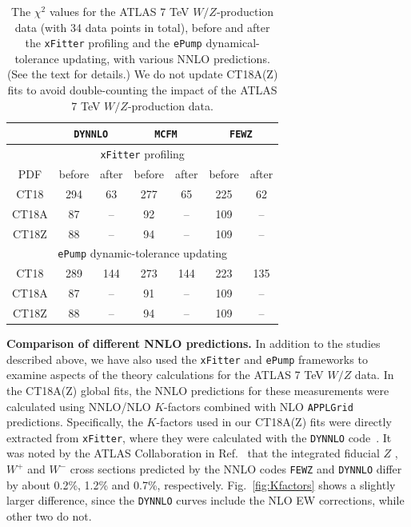 \begin{table}
\caption{
The $\chi^2$ values for the ATLAS 7 TeV $W/Z$-production data (with 34 data points in total), before and after the \texttt{xFitter} profiling and the \texttt{ePump} dynamical-tolerance updating, with various NNLO predictions. (See the text for details.)
We do not update  CT18A(Z) fits to avoid 
double-counting the impact of the ATLAS 7 TeV $W/Z$-production data.
}
\label{tab:chi2Kfactors}
\begin{tabular}{c|c|c|c|c|c|c}
\hline
 &  \multicolumn{2}{c|}{\texttt{DYNNLO}} &    \multicolumn{2}{c|}{\texttt{MCFM}} &  \multicolumn{2}{c}{\texttt{FEWZ}}  \\
\hline
\multicolumn{7}{c}{\texttt{xFitter} profiling}\\
\hline
PDF & before & after   & before & after   & before & after \\
\hline
CT18 & 294 & 63    &  277 & 65  & 225  &  62   \\
CT18A & 87  & --   & 92   & --  & 109  & --    \\
CT18Z & 88 &   --  &  94  & --  & 109  &  --  \\
\hline
\multicolumn{7}{c}{\texttt{ePump} dynamic-tolerance updating}\\
\hline
CT18 & 289 & 144   &  273  & 144    & 223   & 135    \\
CT18A & 87 & --   &  91  & --  &  109 &  --  \\
CT18Z & 88 &   --   &  94  & --  &  109 & --  \\
\hline
\end{tabular}
\end{table}

{\bf Comparison of different NNLO predictions.}
In addition to the studies described above, we have also used the \texttt{xFitter} and \texttt{ePump} frameworks
to examine aspects of the theory calculations for the ATLAS 7 TeV $W/Z$ data.
%
In the CT18A(Z) global fits, the NNLO predictions for these measurements were calculated using NNLO/NLO $K$-factors combined with NLO  \texttt{APPLGrid} predictions.  Specifically, the $K$-factors used in our CT18A(Z) fits were 
directly extracted from \texttt{xFitter}, where they were calculated with the \texttt{DYNNLO} code~\cite{Catani:2007vq,Catani:2009sm}. 
It was noted by the ATLAS Collaboration in 
Ref.~\cite{Aaboud:2016btc} that the integrated fiducial  $Z$ , $W^{+}$ and $W^{-}$ cross sections predicted by the NNLO codes 
\texttt{FEWZ} \cite{Gavin:2010az,Gavin:2012sy,Li:2012wna} and \texttt{DYNNLO} \cite{Catani:2007vq,Catani:2009sm} differ 
by about 0.2\%, 1.2\% and 0.7\%, respectively.
Fig.~\ref{fig:Kfactors} shows a slightly larger difference, since the \texttt{DYNNLO} curves include the NLO EW corrections, while other two do not.


